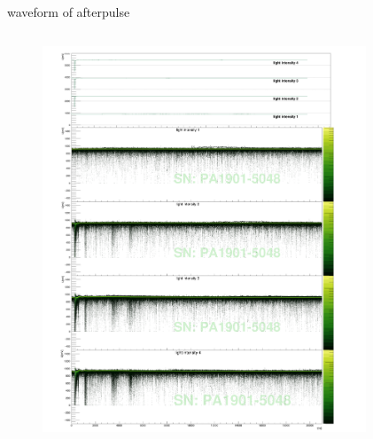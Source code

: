 \documentclass[11pt,compress,xcolor=x11names,UTF8]{beamer}
\begin{document}
\begin{frame}{waveform of afterpulse}
\vspace{-1.3cm}
\begin{columns}
\begin{column}{.485\textwidth}
\begin{figure}
\centering
	\includegraphics[width=1.049\textwidth]{figure/PA1901-5048_avewave}
\end{figure}
\end{column}
\begin{column}{.485\textwidth}
\begin{figure}
\centering

\end{figure}
\end{column}
\end{columns}
\end{frame}
\end{document}
